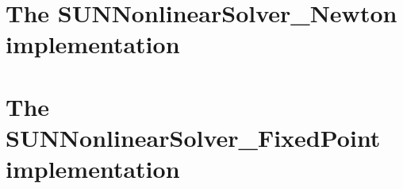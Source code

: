 \section{The SUNNonlinearSolver\_Newton implementation}
\label{s:sunnonlinsol_newton}


\section{The SUNNonlinearSolver\_FixedPoint implementation}
\label{s:sunnonlinsol_fixedpoint}


